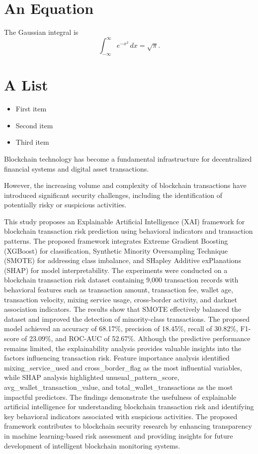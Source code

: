 \documentclass{article}
\begin{document}
\section{An Equation}
The Gaussian integral is
\begin{equation}
    \int_{-\infty}^{\infty} e^{-x^2} \, dx = \sqrt{\pi}.
\end{equation}

\section{A List}
\begin{itemize}
    \item First item
    \item Second item
    \item Third item
\end{itemize}

Blockchain technology has become a fundamental infrastructure for decentralized financial systems and digital asset transactions.

However, the increasing volume and complexity of blockchain transactions have introduced significant security challenges, including the identification of potentially risky or suspicious activities.

This study proposes an Explainable Artificial Intelligence (XAI) framework for blockchain transaction risk prediction using behavioral indicators and transaction patterns.
The proposed framework integrates Extreme Gradient Boosting (XGBoost) for classification, Synthetic Minority Oversampling Technique (SMOTE) for addressing class imbalance, and SHapley Additive exPlanations (SHAP) for model interpretability.
The experiments were conducted on a blockchain transaction risk dataset containing 9,000 transaction records with behavioral features such as transaction amount, transaction fee, wallet age, transaction velocity, mixing service usage, cross-border activity, and darknet association indicators.
The results show that SMOTE effectively balanced the dataset and improved the detection of minority-class transactions. The proposed model achieved an accuracy of 68.17\%, precision of 18.45\%, recall of 30.82\%, F1-score of 23.09\%, and ROC-AUC of 52.67\%. Although the predictive performance remains limited, the explainability analysis provides valuable insights into the factors influencing transaction risk.
Feature importance analysis identified mixing_service_used and cross_border_flag as the most influential variables, while SHAP analysis highlighted unusual_pattern_score, avg_wallet_transaction_value, and total_wallet_transactions as the most impactful predictors.
The findings demonstrate the usefulness of explainable artificial intelligence for understanding blockchain transaction risk and identifying key behavioral indicators associated with suspicious activities.
The proposed framework contributes to blockchain security research by enhancing transparency in machine learning-based risk assessment and providing insights for future development of intelligent blockchain monitoring systems.
\end{document}
